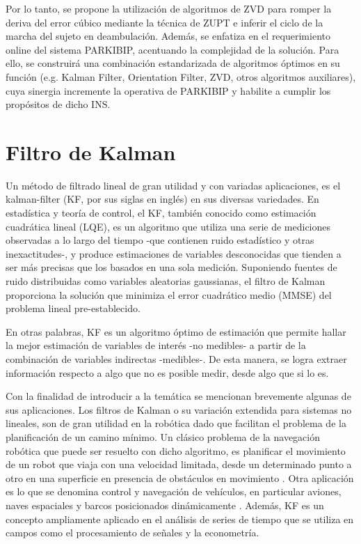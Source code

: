 Por lo tanto, se propone la utilización de algoritmos de ZVD para romper la deriva del error cúbico mediante la técnica de ZUPT e inferir el ciclo de la marcha del sujeto en deambulación. Además, se enfatiza en el requerimiento online del sistema PARKIBIP, acentuando la complejidad de la solución. Para ello, se construirá una combinación estandarizada de algoritmos óptimos en su función (e.g. Kalman Filter, Orientation Filter, ZVD, otros algoritmos auxiliares), cuya sinergia incremente la operativa de PARKIBIP y habilite a cumplir los propósitos de dicho INS.

\section{Filtro de Kalman}\label{section:kalman-filter}

Un método de filtrado lineal de gran utilidad y con variadas aplicaciones, es el \gls{kalman-filter} (KF, por sus siglas en inglés) en sus diversas variedades. En estadística y teoría de control, el KF, también conocido como estimación cuadrática lineal (LQE), es un algoritmo que utiliza una serie de mediciones observadas a lo largo del tiempo -que contienen ruido estadístico y otras inexactitudes-, y produce estimaciones de variables desconocidas que tienden a ser más precisas que los basados en una sola medición. Suponiendo fuentes de ruido distribuidas como variables aleatorias gaussianas, el filtro de Kalman proporciona la solución que minimiza el error cuadrático medio (MMSE) del problema lineal pre-establecido.

En otras palabras, KF es un algoritmo óptimo de estimación que permite hallar la mejor estimación de variables de interés -no medibles- a partir de la combinación de variables indirectas -medibles-. De esta manera, se logra extraer información respecto a algo que no es posible medir, desde algo que si lo es.

Con la finalidad de introducir a la temática se mencionan brevemente algunas de sus aplicaciones. Los filtros de Kalman o su variación extendida para sistemas no lineales, son de gran utilidad en la robótica dado que facilitan el problema de la planificación de un camino mínimo. Un clásico problema de la navegación robótica que puede ser resuelto con dicho algoritmo, es planificar el movimiento de un robot que viaja con una velocidad limitada, desde un determinado punto a otro en una superficie en presencia de obstáculos en movimiento \cite{Nasir2017}.
\noindent Otra aplicación es lo que se denomina control y navegación de vehículos, en particular aviones, naves espaciales y barcos posicionados dinámicamente \cite{Mao2007}. Además, KF es un concepto ampliamente aplicado en el análisis de series de tiempo que se utiliza en campos como el procesamiento de señales y la econometría.


